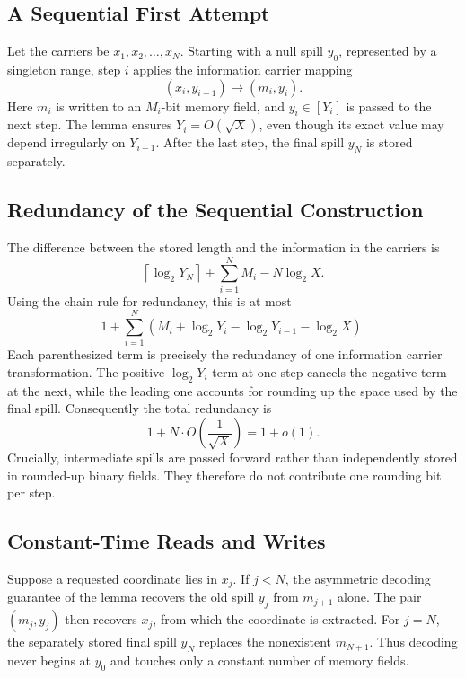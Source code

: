 \subsection{A Sequential First Attempt}

Let the carriers be \(x_1,x_2,\ldots,x_N\). Starting with a null spill
\(y_0\), represented by a singleton range, step \(i\) applies the information
carrier mapping
\[
    (x_i,y_{i-1})\longmapsto(m_i,y_i).
\]
Here \(m_i\) is written to an \(M_i\)-bit memory field, and \(y_i\in[Y_i]\)
is passed to the next step. The lemma ensures \(Y_i=O(\sqrt X)\), even though
its exact value may depend irregularly on \(Y_{i-1}\). After the last step,
the final spill \(y_N\) is stored separately.

\subsection{Redundancy of the Sequential Construction}

The difference between the stored length and the information in the carriers
is
\[
    \left\lceil\log_2Y_N\right\rceil
    +\sum_{i=1}^{N}M_i
    -N\log_2X.
\]
Using the chain rule for redundancy, this is at most
\[
    1+
    \sum_{i=1}^{N}
    \left(
        M_i+\log_2Y_i-\log_2Y_{i-1}-\log_2X
    \right).
\]
Each parenthesized term is precisely the redundancy of one information
carrier transformation. The positive \(\log_2Y_i\) term at one step cancels
the negative term at the next, while the leading one accounts for rounding
up the space used by the final spill. Consequently the total redundancy is
\[
    1+N\cdot O\left(\frac{1}{\sqrt X}\right)=1+o(1).
\]
Crucially, intermediate spills are passed forward rather than independently
stored in rounded-up binary fields. They therefore do not contribute one
rounding bit per step.

\subsection{Constant-Time Reads and Writes}

Suppose a requested coordinate lies in \(x_j\). If \(j<N\), the asymmetric
decoding guarantee of the lemma recovers the old spill \(y_j\) from
\(m_{j+1}\) alone. The pair \((m_j,y_j)\) then recovers \(x_j\), from which
the coordinate is extracted. For \(j=N\), the separately stored final spill
\(y_N\) replaces the nonexistent \(m_{N+1}\). Thus decoding never begins at
\(y_0\) and touches only a constant number of memory fields.

